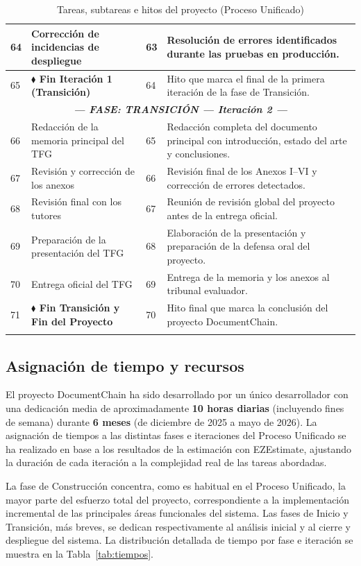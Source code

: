 \documentclass[11pt, a4paper]{article}
\begin{document}
\begin{longtable}{|p{1cm}|p{5.5cm}|p{1.5cm}|p{5.5cm}|}
\hline
64 & Corrección de incidencias de despliegue & 63 & Resolución de errores identificados durante las pruebas en producción. \\
\hline
65 & \textbf{$\blacklozenge$ Fin Iteración 1 (Transición)} & 64 & Hito que marca el final de la primera iteración de la fase de Transición. \\
\hline
\multicolumn{4}{|c|}{\textit{\textbf{--- FASE: TRANSICIÓN --- Iteración 2 ---}}} \\
\hline
66 & Redacción de la memoria principal del TFG & 65 & Redacción completa del documento principal con introducción, estado del arte y conclusiones. \\
\hline
67 & Revisión y corrección de los anexos & 66 & Revisión final de los Anexos I--VI y corrección de errores detectados. \\
\hline
68 & Revisión final con los tutores & 67 & Reunión de revisión global del proyecto antes de la entrega oficial. \\
\hline
69 & Preparación de la presentación del TFG & 68 & Elaboración de la presentación y preparación de la defensa oral del proyecto. \\
\hline
70 & Entrega oficial del TFG & 69 & Entrega de la memoria y los anexos al tribunal evaluador. \\
\hline
71 & \textbf{$\blacklozenge$ Fin Transición y Fin del Proyecto} & 70 & Hito final que marca la conclusión del proyecto DocumentChain. \\
\hline
\caption{Tareas, subtareas e hitos del proyecto (Proceso Unificado)}\label{tab:tareas-hitos}
\end{longtable}

\subsection{Asignación de tiempo y recursos}

El proyecto DocumentChain ha sido desarrollado por un único desarrollador con una dedicación media de aproximadamente \textbf{10 horas diarias} (incluyendo fines de semana) durante \textbf{6 meses} (de diciembre de 2025 a mayo de 2026). La asignación de tiempos a las distintas fases e iteraciones del Proceso Unificado se ha realizado en base a los resultados de la estimación con EZEstimate, ajustando la duración de cada iteración a la complejidad real de las tareas abordadas.

La fase de Construcción concentra, como es habitual en el Proceso Unificado, la mayor parte del esfuerzo total del proyecto, correspondiente a la implementación incremental de las principales áreas funcionales del sistema. Las fases de Inicio y Transición, más breves, se dedican respectivamente al análisis inicial y al cierre y despliegue del sistema. La distribución detallada de tiempo por fase e iteración se muestra en la Tabla~\ref{tab:tiempos}.
\end{document}

